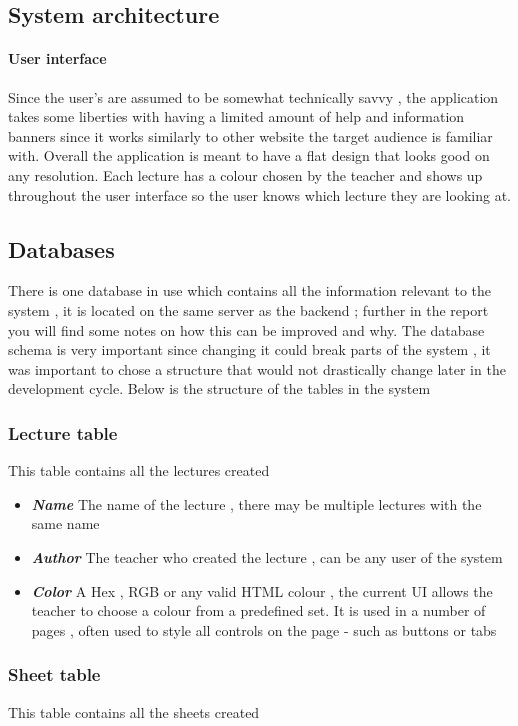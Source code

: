 \subsection{System architecture}
\paragraph{User interface}
Since the user's are assumed to be somewhat technically savvy , the application takes some liberties with having a limited amount of help and information banners since it works similarly to other website the target audience is familiar with.
Overall the application is meant to have a flat design that looks good on any resolution.
Each lecture has a colour chosen by the teacher and shows up throughout the user interface so the user knows which lecture they are looking at.

\subsection{Databases}
There is one database in use which contains all the information relevant to the system , it is located on the same server as the backend ; further in the report you will find some notes on how this can be improved and why.
The database schema is very important since changing it could break parts of the system , it was important to chose a structure that would not drastically change later in the development cycle.
Below is the structure of the tables in the system

\subsubsection{Lecture table}
This table contains all the lectures created

\begin{itemize}
	\item \textit{\textbf{Name}} The name of the lecture , there may be multiple lectures with the same name
	\item  \textit{\textbf{Author}} The teacher who created the lecture , can be any user of the system
	\item  \textit{\textbf{Color}} A Hex , RGB or any valid HTML colour , the current UI allows the teacher to choose a colour from a predefined set. It is used in a number of pages , often used to style all controls on the page - such as buttons or tabs	
\end{itemize}

\subsubsection{Sheet table}
This table contains all the sheets created

